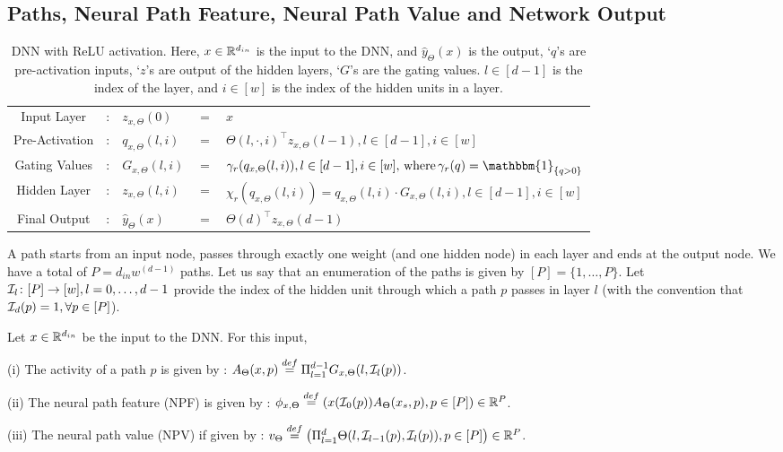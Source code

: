 \subsection{Paths, Neural Path Feature, Neural Path Value and Network Output}
\begin{table}[h]
\centering
\begin{tabular}{|c l lll|}\hline
Input Layer&: &$z_{x,\Theta}(0)$ &$=$ &$x$ \\
Pre-Activation&: & $q_{x,\Theta}(l,i)$& $=$ & ${\Theta(l,\cdot,i)}^\top z_{x,\Theta}(l-1), l\in[d-1],i\in[w]$\\
Gating Values&: &$G_{x,\Theta}(l,i)$& $=$ & $\gamma_r(q_{x,\Theta}(l,i)), l\in[d-1],i\in[w],\, \text{where}\,\gamma_r(q)=\mathbbm{1}_{\{q>0\}}$ \\
Hidden Layer&: &$z_{x,\Theta}(l,i)$ & $=$ & $\chi_r(q_{x,\Theta}(l,i))= q_{x,\Theta}(l,i)\cdot G_{x,\Theta}(l,i), l\in[d-1],i\in[w]$ \\
Final Output&: & $\hat{y}_{\Theta}(x)$ & $=$ & ${\Theta(d)}^\top z_{x,\Theta}(d-1)$\\\hline
\end{tabular}
\caption{DNN with ReLU activation. Here, $x\in\mathbb{R}^{d_{in}}$ is the input to the DNN, and   $\hat{y}_{\Theta}(x)$ is the output, `$q$'s are pre-activation inputs, `$z$'s are output of the hidden layers, `$G$'s are the gating values. $l\in[d-1]$ is the index of the layer, and $i\in[w]$ is the index of the hidden units in a layer.}
\label{tb:basic}
\end{table}
A path starts from an input node, passes through exactly one weight (and one hidden node) in each layer and ends at the output node. We have a total of $P=d_{in}w^{(d-1)}$ paths. Let us say that an enumeration of the paths is given by $[P]=\{1,\ldots,P\}$. Let $\mathcal{I}_{l}\colon [P]\rightarrow [w],l=0,\ldots,d-1$ provide the index of the hidden unit through which a path $p$ passes in layer $l$ (with the convention that $\mathcal{I}_d(p)=1,\forall p\in [P]$). 
\begin{definition}\label{def:nps} Let $x\in\mathbb{R}^{d_{in}}$ be the input to the DNN. For this input, 

(i) The activity of a path $p$ is given by : $A_{\Theta}(x,p)\stackrel{def}{=}\Pi_{l=1}^{d-1} G_{x,\Theta}(l,\mathcal{I}_l(p))$.

(ii) The {neural path feature} (NPF) is given by :  $\phi_{x,\Theta}\stackrel{def}=\left(x(\mathcal{I}_0(p))A_{\Theta}(x_s,p) ,p\in[P]\right)\in\mathbb{R}^P$. 

(iii) The {neural path value} (NPV) if given by : $v_{\Theta}\stackrel{def}=\left(\Pi_{l=1}^d \Theta(l,\mathcal{I}_{l-1}(p),\mathcal{I}_l(p)),p\in[P]\right)\in\mathbb{R}^P$.
\end{definition}
